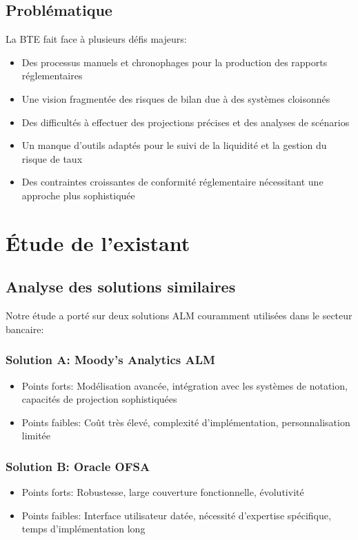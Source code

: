 \documentclass[12pt,a4paper]{report}
\begin{document}
\subsection{Problématique}
La BTE fait face à plusieurs défis majeurs:
\begin{itemize}
    \item Des processus manuels et chronophages pour la production des rapports réglementaires
    \item Une vision fragmentée des risques de bilan due à des systèmes cloisonnés
    \item Des difficultés à effectuer des projections précises et des analyses de scénarios
    \item Un manque d'outils adaptés pour le suivi de la liquidité et la gestion du risque de taux
    \item Des contraintes croissantes de conformité réglementaire nécessitant une approche plus sophistiquée
\end{itemize}

\section{Étude de l'existant}

\subsection{Analyse des solutions similaires}
Notre étude a porté sur deux solutions ALM couramment utilisées dans le secteur bancaire:

\subsubsection{Solution A: Moody's Analytics ALM}
\begin{itemize}
    \item Points forts: Modélisation avancée, intégration avec les systèmes de notation, capacités de projection sophistiquées
    \item Points faibles: Coût très élevé, complexité d'implémentation, personnalisation limitée
\end{itemize}

\subsubsection{Solution B: Oracle OFSA}
\begin{itemize}
    \item Points forts: Robustesse, large couverture fonctionnelle, évolutivité
    \item Points faibles: Interface utilisateur datée, nécessité d'expertise spécifique, temps d'implémentation long
\end{itemize}
\end{document}
